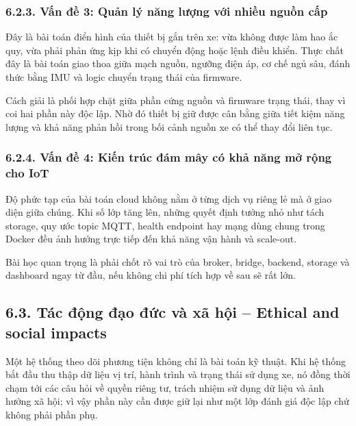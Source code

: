 \documentclass[a4paper]{extarticle}
\begin{document}
\subsubsection{6.2.3. Vấn đề 3: Quản lý năng lượng với nhiều nguồn
cấp}\label{623-vux1ea5n-ux111ux1ec1-3-quux1ea3n-luxfd-nux103ng-lux1b0ux1ee3ng-vux1edbi-nhiux1ec1u-nguux1ed3n-cux1ea5p}

Đây là bài toán điển hình của thiết bị gắn trên xe: vừa không được làm hao ắc quy, vừa phải phản ứng kịp khi có chuyển động hoặc lệnh điều khiển. Thực chất đây là bài toán giao thoa giữa mạch nguồn, ngưỡng điện áp, cơ chế ngủ sâu, đánh thức bằng IMU và logic chuyển trạng thái của firmware.

Cách giải là phối hợp chặt giữa phần cứng nguồn và firmware trạng thái, thay vì coi hai phần này độc lập. Nhờ đó thiết bị giữ được cân bằng giữa tiết kiệm năng lượng và khả năng phản hồi trong bối cảnh nguồn xe có thể thay đổi liên tục.

\subsubsection{6.2.4. Vấn đề 4: Kiến trúc đám mây có khả năng mở rộng
cho IoT}\label{624-vux1ea5n-ux111ux1ec1-4-kiux1ebfn-truxfac-ux111uxe1m-muxe2y-cuxf3-khux1ea3-nux103ng-mux1edf-rux1ed9ng-cho-iot}

Độ phức tạp của bài toán cloud không nằm ở từng dịch vụ riêng lẻ mà ở giao diện giữa chúng. Khi số lớp tăng lên, những quyết định tưởng nhỏ như tách storage, quy ước topic MQTT, health endpoint hay mạng dùng chung trong Docker đều ảnh hưởng trực tiếp đến khả năng vận hành và scale-out.

Bài học quan trọng là phải chốt rõ vai trò của broker, bridge, backend, storage và dashboard ngay từ đầu, nếu không chi phí tích hợp về sau sẽ rất lớn.

\subsection{6.3. Tác động đạo đức và xã hội -- Ethical and social impacts}\label{63-tuxe1c-ux111ux1ed9ng-ux111ux1ea1o-ux111ux1ee9c-vuxe0-xuxe3-hux1ed9i--ethical-and-social-impacts}

Một hệ thống theo dõi phương tiện không chỉ là bài toán kỹ thuật. Khi hệ thống bắt đầu thu thập dữ liệu vị trí, hành trình và trạng thái sử dụng xe, nó đồng thời chạm tới các câu hỏi về quyền riêng tư, trách nhiệm sử dụng dữ liệu và ảnh hưởng xã hội; vì vậy phần này cần được giữ lại như một lớp đánh giá độc lập chứ không phải phần phụ.
\end{document}
